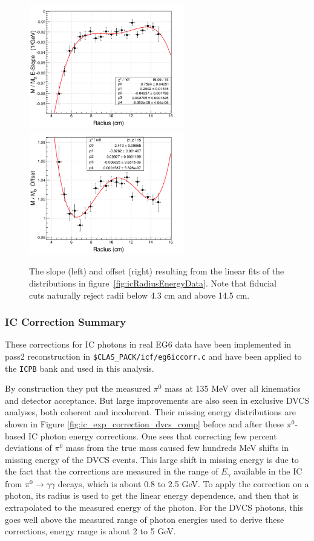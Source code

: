 \begin{figure}[tbp]\centering
\includegraphics[height=5.4cm]{fig_simulation/m_m0_pi0_slope.png}
\includegraphics[height=5.4cm]{fig_simulation/m_m0_pi0_offset.png}
\caption{The slope (left) and offset (right) resulting from the linear fits of the distributions in figure~\ref{fig:icRadiusEnergyData}.  Note that fiducial cuts naturally reject radii below 4.3 cm and above 14.5 cm.}%
\label{fig:icRadiusEnergySlopeOffset}
\end{figure}

\subsubsection{IC Correction Summary}
These corrections for IC photons in real EG6 data have been implemented in pass2 reconstruction in \texttt{\$CLAS\_PACK/icf/eg6iccorr.c} and have been applied to the \texttt{ICPB} bank and used in this analysis.

By construction they put the measured $\pi^0$ mass at 135 MeV over all 
kinematics and detector acceptance.  But large improvements are also seen in 
exclusive DVCS analyses, both coherent and incoherent. Their missing energy 
distributions are shown in Figure \ref{fig:ic_exp_correction_dvcs_comp} before 
and after these $\pi^0$-based IC photon energy corrections. One sees that 
correcting few percent deviations of $\pi^{0}$ mass from the true mass caused 
few hundreds MeV shifts in missing energy of the DVCS events. This large shift 
in missing energy is due to the fact that the corrections are measured in the 
range of $E_\gamma$ available in the IC from $\pi^0\to\gamma\gamma$ decays, 
which is about 0.8 to 2.5 GeV. To apply the correction on a photon, its radius 
is used to get the linear energy dependence, and then that is extrapolated to 
the measured energy of the photon.  For the DVCS photons, this goes well above 
the measured range of photon energies used to derive these corrections, energy 
range is about 2 to 5 GeV.  


